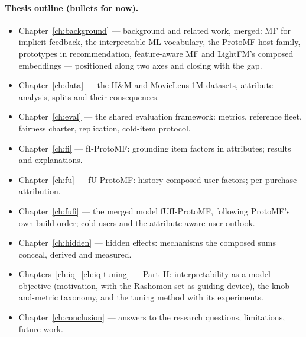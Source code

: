 \paragraph{Thesis outline (bullets for now).}
\begin{itemize}
    \item Chapter~\ref{ch:background} — background and related work, merged: MF for implicit feedback, the interpretable-ML vocabulary, the ProtoMF host family, prototypes in recommendation, feature-aware MF and LightFM's composed embeddings — positioned along two axes and closing with the gap.
    \item Chapter~\ref{ch:data} — the H\&M and MovieLens-1M datasets, attribute analysis, splits and their consequences.
    \item Chapter~\ref{ch:eval} — the shared evaluation framework: metrics, reference fleet, fairness charter, replication, cold-item protocol.
    \item Chapter~\ref{ch:fi} — fI-ProtoMF: grounding item factors in attributes; results and explanations.
    \item Chapter~\ref{ch:fu} — fU-ProtoMF: history-composed user factors; per-purchase attribution.
    \item Chapter~\ref{ch:fufi} — the merged model fUfI-ProtoMF, following ProtoMF's own build order; cold users and the attribute-aware-user outlook.
    \item Chapter~\ref{ch:hidden} — hidden effects: mechanisms the composed sums conceal, derived and measured.
    \item Chapters~\ref{ch:iq}--\ref{ch:iq-tuning} — Part~II: interpretability as a model objective (motivation, with the Rashomon set as guiding device), the knob-and-metric taxonomy, and the tuning method with its experiments.
    \item Chapter~\ref{ch:conclusion} — answers to the research questions, limitations, future work.
\end{itemize}
